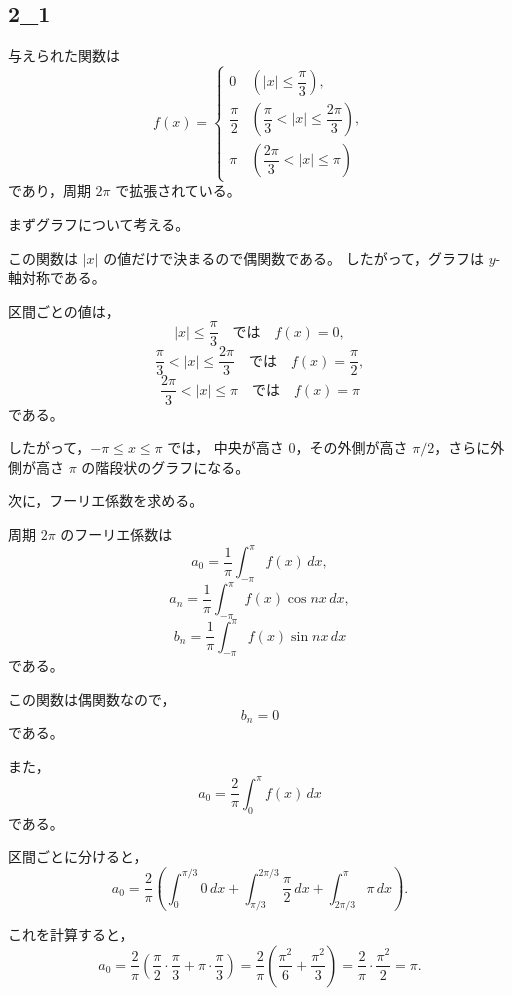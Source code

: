 
\subsection{2_1}
\begin{solution}
	与えられた関数は
	\[
	f(x)=
	\begin{cases}
		0
		& \left(|x|\leq \dfrac{\pi}{3}\right),\\[6pt]
		\dfrac{\pi}{2}
		& \left(\dfrac{\pi}{3}<|x|\leq \dfrac{2\pi}{3}\right),\\[6pt]
		\pi
		& \left(\dfrac{2\pi}{3}<|x|\leq \pi\right)
	\end{cases}
	\]
	であり，周期 \(2\pi\) で拡張されている。
	
	\medskip
	
	まずグラフについて考える。
	
	この関数は \(|x|\) の値だけで決まるので偶関数である。
	したがって，グラフは \(y\)-軸対称である。
	
	区間ごとの値は，
	\[
	|x|\leq \frac{\pi}{3}
	\quad\text{では}\quad
	f(x)=0,
	\]
	\[
	\frac{\pi}{3}<|x|\leq \frac{2\pi}{3}
	\quad\text{では}\quad
	f(x)=\frac{\pi}{2},
	\]
	\[
	\frac{2\pi}{3}<|x|\leq \pi
	\quad\text{では}\quad
	f(x)=\pi
	\]
	である。
	
	したがって，\(-\pi\leq x\leq \pi\) では，
	中央が高さ \(0\)，その外側が高さ \(\pi/2\)，さらに外側が高さ \(\pi\) の階段状のグラフになる。
	
	\medskip
	
	次に，フーリエ係数を求める。
	
	周期 \(2\pi\) のフーリエ係数は
	\[
	a_0=\frac{1}{\pi}\int_{-\pi}^{\pi}f(x)\,dx,
	\]
	\[
	a_n=\frac{1}{\pi}\int_{-\pi}^{\pi}f(x)\cos nx\,dx,
	\]
	\[
	b_n=\frac{1}{\pi}\int_{-\pi}^{\pi}f(x)\sin nx\,dx
	\]
	である。
	
	この関数は偶関数なので，
	\[
	b_n=0
	\]
	である。
	
	また，
	\[
	a_0
	=
	\frac{2}{\pi}\int_0^\pi f(x)\,dx
	\]
	である。
	
	区間ごとに分けると，
	\[
	a_0
	=
	\frac{2}{\pi}
	\left(
	\int_0^{\pi/3}0\,dx
	+
	\int_{\pi/3}^{2\pi/3}\frac{\pi}{2}\,dx
	+
	\int_{2\pi/3}^{\pi}\pi\,dx
	\right).
	\]
	
	これを計算すると，
	\[
	a_0
	=
	\frac{2}{\pi}
	\left(
	\frac{\pi}{2}\cdot \frac{\pi}{3}
	+
	\pi\cdot \frac{\pi}{3}
	\right)
	=
	\frac{2}{\pi}
	\left(
	\frac{\pi^2}{6}+\frac{\pi^2}{3}
	\right)
	=
	\frac{2}{\pi}\cdot \frac{\pi^2}{2}
	=
	\pi.
	\]
	

\end{solution}
